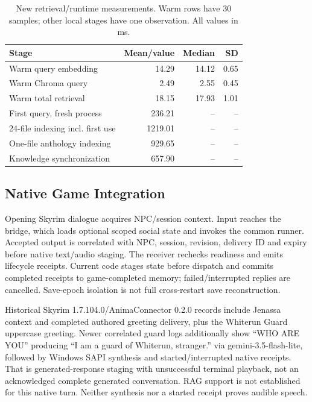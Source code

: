 \documentclass[conference]{IEEEtran}
\begin{document}
\begin{table}[t]
\caption{New retrieval/runtime measurements. Warm rows have 30 samples; other local stages have one observation. All values in ms.}
\label{tab:timing}
\centering\small
\begin{tabular}{lrrr}
\toprule
Stage & Mean/value & Median & SD \\
\midrule
Warm query embedding & 14.29 & 14.12 & 0.65 \\
Warm Chroma query & 2.49 & 2.55 & 0.45 \\
Warm total retrieval & 18.15 & 17.93 & 1.01 \\
First query, fresh process & 236.21 & -- & -- \\
24-file indexing incl. first use & 1219.01 & -- & -- \\
One-file anthology indexing & 929.65 & -- & -- \\
Knowledge synchronization & 657.90 & -- & -- \\
\bottomrule
\end{tabular}
\end{table}

\subsection{Native Game Integration}
Opening Skyrim dialogue acquires NPC/session context. Input reaches the bridge, which loads optional scoped social state and invokes the common runner. Accepted output is correlated with NPC, session, revision, delivery ID and expiry before native text/audio staging. The receiver rechecks readiness and emits lifecycle receipts. Current code stages state before dispatch and commits completed receipts to game-completed memory; failed/interrupted replies are cancelled. Save-epoch isolation is not full cross-restart save reconstruction.

Historical Skyrim 1.7.104.0/AnimaConnector 0.2.0 records include Jenassa context and completed authored greeting delivery, plus the Whiterun Guard uppercase greeting. Newer correlated guard logs additionally show ``WHO ARE YOU'' producing ``I am a guard of Whiterun, stranger.'' via gemini-3.5-flash-lite, followed by Windows SAPI synthesis and started/interrupted native receipts. That is generated-response staging with unsuccessful terminal playback, not an acknowledged complete generated conversation. RAG support is not established for this native turn. Neither synthesis nor a started receipt proves audible speech.
\end{document}
